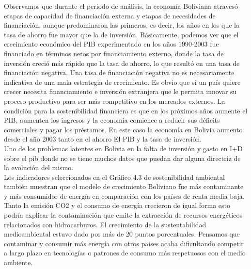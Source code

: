     Observamos que durante el periodo de análisis, la economía Boliviana atravesó etapas de capacidad de financiación externa y etapas de necesidades de financiación, aunque predominaron las primeras, es decir, los años en los que la tasa de ahorro fue mayor que la de inversión. Básicamente, podemos ver que el crecimiento económico del PIB experimentado en los años 1990-2003 fue financiado en términos netos por financiamiento externo,  donde la tasa de inversión creció más rápido que la tasa de ahorro, lo que resultó en una tasa de financiación negativa. Una tasa de financiación negativa no es necesariamente indicativa de una mala estrategia de crecimiento. Es obvio que si un país quiere crecer necesita financiamiento e inversión extranjera que le permita innovar su proceso productivo para ser más competitivo en los mercados externos. La condición para la sostenibilidad financiera es que en los próximos años aumente el PIB, aumenten los ingresos y la economía comience a reducir sus déficits comerciales y pagar los préstamos. En este caso la economía en Bolivia aumento desde el año 2003 tanto en el ahorro El PIB y la tasa de inversión. \\
    Uno de los problemas latentes en Bolivia en la falta de inversión y gasto en I+D sobre el pib donde no se tiene muchos datos que puedan dar alguna directriz de la evolución del mismo.\\
    Los indicadores seleccionados en el Gráfico 4.3 de sostenibilidad ambiental también muestran que el modelo de crecimiento Boliviano fue más contaminante y más consumidor de energía en comparación con los países de renta media baja. Tanto la emisión CO2 y el consumo de energía crecieron de igual forma esto podría explicar la contaminación que emite la extracción de recursos energéticos relacionados con hidrocarburos. El crecimiento de la sustentabilidad medioambiental estuvo dado por más de 20 puntos porcentuales. Pensamos que contaminar y consumir más energía con otros países acaba dificultando competir a largo plazo en tecnologías o patrones de consumo más respetuosos con el medio ambiente.

